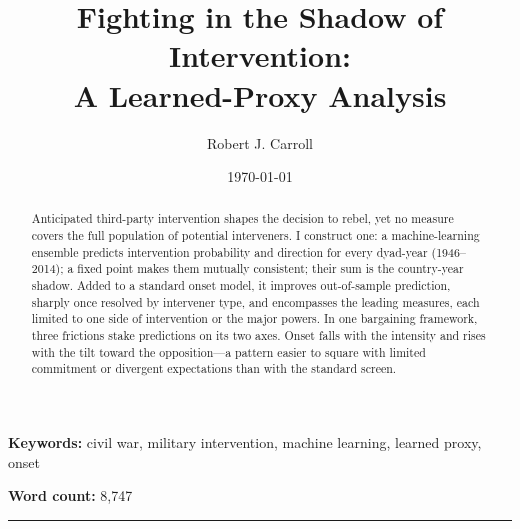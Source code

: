 \documentclass[12pt]{article}
\title{Fighting in the Shadow of Intervention:\\A Learned-Proxy Analysis}
\author{Robert J. Carroll}
\date{\today}
\begin{document}
\maketitle
\thispagestyle{empty}

\begin{abstract}

Anticipated third-party intervention shapes the decision to rebel, yet
no measure covers the full population of potential interveners.  I construct one: a machine-learning ensemble
predicts intervention probability and direction for every dyad-year
(1946--2014); a fixed point makes them mutually consistent; their
sum is the country-year shadow.  Added to a standard onset model, it
improves out-of-sample prediction, sharply once resolved by intervener
type, and encompasses the leading measures, each limited to one side of
intervention or the major powers.  In one bargaining framework, three
frictions stake predictions on its two axes.  Onset falls with the
intensity and rises with the tilt toward the
opposition---a pattern easier to square with limited commitment or
divergent expectations than with the standard screen.
\end{abstract}

\noindent\textbf{Keywords:} civil war, military intervention, machine learning, learned proxy, onset

\noindent\textbf{Word count:} 8,747  %

\vfill
\begin{center}
\rule{\textwidth}{0.5pt}
\end{center}


\clearpage
\setcounter{page}{1}
\end{document}
